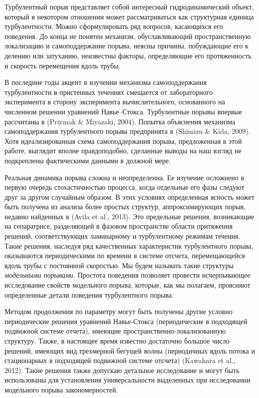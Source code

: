 Турбулентный порыв представляет собой интересный гидродинамический объект, который в некотором отношении может рассматриваться как структурная единица турбулентности. Можно сформулировать ряд вопросов, касающихся его поведения. До конца не понятен механизм, обуславливающий пространственную локализацию и самоподдержание порыва, неясны причины, побуждающие его к делению или затуханию, неизвестны факторы, определяющие его протяженность и скорость перемещения вдоль трубы.

В последние годы акцент в изучении механизма самоподдержания турбулентности в пристенных течениях смещается от лабораторного эксперимента в сторону эксперимента вычислительного, основанного на численном решении уравнений Навье--Стокса. Турбулентные порывы впервые рассчитаны в (Priymak \& Miyazaki, 2004).
Попытка объяснения механизма самоподдержания турбулентного порыва предпринята в (Shimizu \& Kida, 2009). Хотя идеализированная схема самоподдержания порыва, предложенная в этой работе, выглядит вполне правдоподобно, сделанные выводы на наш взгляд не подкреплены фактическими данными в должной мере. 

Реальная динамика порыва сложна и неопределенна. Ее изучение осложнено в первую очередь стохастичностью процесса, когда отдельные его фазы следуют друг за другом случайным образом. В этих условиях определенная ясность может быть получена из анализа более простых структур, аппроксимирующих порыв, недавно найденных в (Avila et al., 2013). Это предельные решения, возникающие на сепаратрисе, разделяющей в фазовом пространстве области притяжения решений, соответствующих ламинарному и турбулентному режимам течения. Такие решения, наследуя ряд качественных характеристик турбулентного порыва, оказываются периодическими по времени в системе отсчета, перемещающейся вдоль трубы с постоянной скоростью. Мы будем называть такие структуры {\it модельными порывами}. Простота поведения позволяет провести исчерпывающее исследование свойств модельного порыва, которые, как мы полагаем, проясняют определенные детали поведения турбулентного порыва. 

Методом продолжения по параметру могут быть получены другие условно периодические решения уравнений Навье-Стокса (периодические в подходящей подвижной системе отчета), имеющие пространственно-локализованную структуру. Также, в настоящее время известно достаточно большое число решений, имеющих вид трехмерной бегущей волны (периодичных вдоль потока и стационарных в подходящей подвижной системе отсчета) (Kawahara et al., 2012). Такие решения также допускаю детальное исследование и могут быть использованы для установления универсальности выделенных при исследовании модельного порыва закономерностей. 

